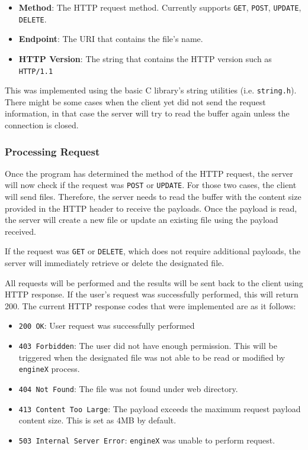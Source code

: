 \documentclass{homework}
\begin{document}
\begin{itemize}
    \item \textbf{Method}: The HTTP request method. Currently supports \texttt{GET}, \texttt{POST}, \texttt{UPDATE}, \texttt{DELETE}.
    \item \textbf{Endpoint}: The URI that contains the file's name.
    \item \textbf{HTTP Version}: The string that contains the HTTP version such as \texttt{HTTP/1.1}
\end{itemize}

This was implemented using the basic C library's string utilities (i.e. \texttt{string.h}). There might be some cases when the client yet did not send the request information, in that case the server will try to read the buffer again unless the connection is closed.

\subsubsection{Processing Request}
Once the program has determined the method of the HTTP request, the server will now check if the request was \texttt{POST} or \texttt{UPDATE}. For those two cases, the client will send files. Therefore, the server needs to read the buffer with the content size provided in the HTTP header to receive the payloads. Once the payload is read, the server will create a new file or update an existing file using the payload received.

If the request was \texttt{GET} or \texttt{DELETE}, which does not require additional payloads, the server will immediately retrieve or delete the designated file.

All requests will be performed and the results will be sent back to the client using HTTP response. If the user's request was successfully performed, this will return 200. The current HTTP response codes that were implemented are as it follows:


\begin{itemize}
    \item \texttt{200 OK}: User request was successfully performed
    \item \texttt{403 Forbidden}: The user did not have enough permission. This will be triggered when the designated file was not able to be read or modified by \texttt{engineX} process.
    \item \texttt{404 Not Found}: The file was not found under web directory.
    \item \texttt{413 Content Too Large}: The payload exceeds the maximum request payload content size. This is set as 4MB by default.
    \item \texttt{503 Internal Server Error}: \texttt{engineX} was unable to perform request. 
\end{itemize}
\end{document}
